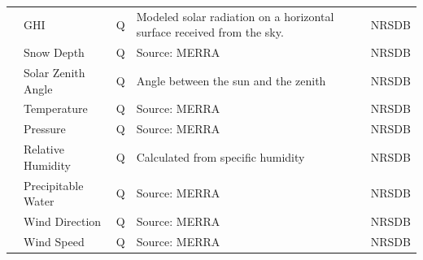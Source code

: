 \documentclass[12pt]{article}
\begin{document}
{\begin{longtable}{lllp{4cm}p{4cm}}
              & GHI                        & Q    & Modeled solar radiation on a horizontal surface received from the sky.                                                                   & NRSDB                                                                   \\
              & Snow Depth                 & Q    & Source: MERRA                                                                                                                            & NRSDB                                                                   \\
              & Solar Zenith Angle         & Q    & Angle between the sun and the zenith                                                                                                     & NRSDB                                                                   \\
              & Temperature                & Q    & Source: MERRA                                                                                                                            & NRSDB                                                                   \\
              & Pressure                   & Q    & Source: MERRA                                                                                                                            & NRSDB                                                                   \\
              & Relative Humidity          & Q    & Calculated from specific humidity                                                                                                        & NRSDB                                                                   \\
              & Precipitable Water         & Q    & Source: MERRA                                                                                                                            & NRSDB                                                                   \\
              & Wind Direction             & Q    & Source: MERRA                                                                                                                            & NRSDB                                                                   \\
              & Wind Speed                 & Q    & Source: MERRA                                                                                                                            & NRSDB                                                                   \\

\end{longtable}}
\end{document}
